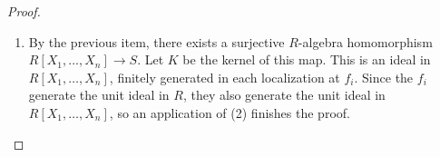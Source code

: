 \begin{proof}
\begin{enumerate}
$S$. Let $Y$ be the union of these sets. This is still a finite set.
Consider the algebra homomorphism $R[X_y]_{y \in Y} \rightarrow S$
induced by $Y$. Since it is an algebra homomorphism, the image $T$
is an $R$-submodule of the $R$-module $S$, so we can consider the
quotient module $S/T$. By assumption, this is zero if we localize
at the $f_i$, so it is zero by (1) and therefore $S$ is an
$R$-algebra of finite type.
\item By the previous item, there exists a surjective $R$-algebra
homomorphism $R[X_1, \ldots, X_n] \rightarrow S$. Let $K$ be the kernel
of this map. This is an ideal in $R[X_1, \ldots, X_n]$, finitely generated
in each localization at $f_i$. Since the $f_i$ generate the unit ideal
in $R$, they also generate the unit ideal in $R[X_1, \ldots, X_n]$, so an
application of (2) finishes the proof.
\end{enumerate}
\end{proof}
